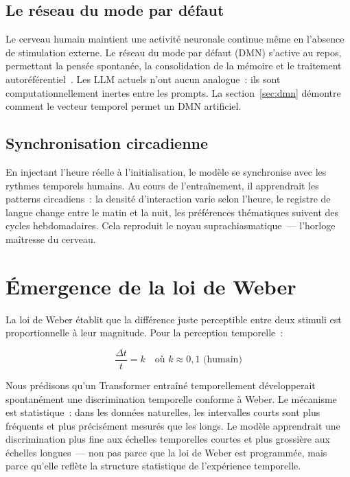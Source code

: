 \documentclass[10pt,twocolumn,letterpaper]{article}
\begin{document}
\subsection{Le r\'eseau du mode par d\'efaut}

Le cerveau humain maintient une activit\'e neuronale continue m\^eme en l'absence de stimulation externe. Le r\'eseau du mode par d\'efaut (DMN) s'active au repos, permettant la pens\'ee spontan\'ee, la consolidation de la m\'emoire et le traitement autor\'ef\'erentiel~\cite{raichle2001}. Les LLM actuels n'ont aucun analogue~: ils sont computationnellement inertes entre les prompts. La section~\ref{sec:dmn} d\'emontre comment le vecteur temporel permet un DMN artificiel.

\subsection{Synchronisation circadienne}

En injectant l'heure r\'eelle \`a l'initialisation, le mod\`ele se synchronise avec les rythmes temporels humains. Au cours de l'entra\^inement, il apprendrait les patterns circadiens~: la densit\'e d'interaction varie selon l'heure, le registre de langue change entre le matin et la nuit, les pr\'ef\'erences th\'ematiques suivent des cycles hebdomadaires. Cela reproduit le noyau suprachiasmatique~--- l'horloge ma\^itresse du cerveau.

\section{\'Emergence de la loi de Weber}

La loi de Weber \'etablit que la diff\'erence juste perceptible entre deux stimuli est proportionnelle \`a leur magnitude. Pour la perception temporelle~:

\begin{equation}
\frac{\Delta t}{t} = k \quad \text{o\`u } k \approx 0{,}1 \text{ (humain)}
\label{eq:weber}
\end{equation}

Nous pr\'edisons qu'un Transformer entra\^in\'e temporellement d\'evelopperait spontan\'ement une discrimination temporelle conforme \`a Weber. Le m\'ecanisme est statistique~: dans les donn\'ees naturelles, les intervalles courts sont plus fr\'equents et plus pr\'ecis\'ement mesur\'es que les longs. Le mod\`ele apprendrait une discrimination plus fine aux \'echelles temporelles courtes et plus grossi\`ere aux \'echelles longues~--- non pas parce que la loi de Weber est programm\'ee, mais parce qu'elle refl\`ete la structure statistique de l'exp\'erience temporelle.
\end{document}
